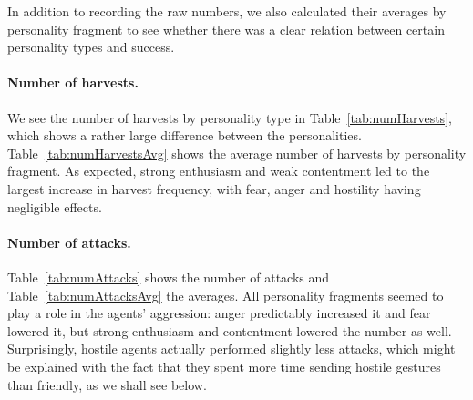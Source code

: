 In addition to recording the raw numbers, we also calculated their averages by personality fragment to see whether there was a clear relation between certain personality types and success.

\paragraph{Number of harvests.} We see the number of harvests by personality type in Table~\ref{tab:numHarvests}, which shows a rather large difference between the personalities. Table~\ref{tab:numHarvestsAvg} shows the average number of harvests by personality fragment. As expected, strong enthusiasm and weak contentment led to the largest increase in harvest frequency, with fear, anger and hostility having negligible effects.

\paragraph{Number of attacks.} Table~\ref{tab:numAttacks} shows the number of attacks and Table~\ref{tab:numAttacksAvg} the averages. All personality fragments seemed to play a role in the agents' aggression: anger predictably increased it and fear lowered it, but strong enthusiasm and contentment lowered the number as well. Surprisingly, hostile agents actually performed slightly less attacks, which might be explained with the fact that they spent more time sending hostile gestures than friendly, as we shall see below.

